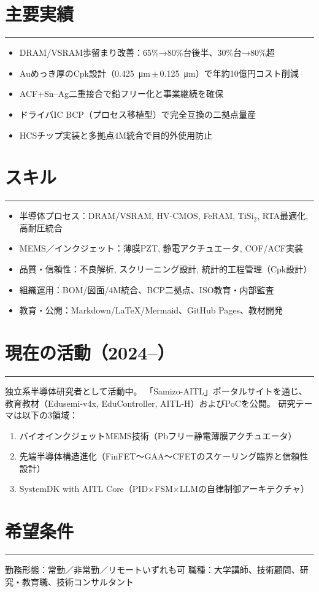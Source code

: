 \documentclass[11pt,ja=standard]{bxjsarticle}
\newcommand{\cvsection}[1]{\section*{#1}\vspace{-0.3em}\hrule\vspace{0.5em}}
\begin{document}
\cvsection{主要実績}
\begin{itemize}
  \item DRAM/VSRAM歩留まり改善：65\%→80\%台後半、30\%台→80\%超
  \item Auめっき厚のCpk設計（\SI{0.425}{\micro\metre}\,\(\pm\)\,\SI{0.125}{\micro\metre}）で年約10億円コスト削減
  \item ACF+Sn--Ag二重接合で鉛フリー化と事業継続を確保
  \item ドライバIC BCP（プロセス移植型）で完全互換の二拠点量産
  \item HCSチップ実装と多拠点4M統合で目的外使用防止
\end{itemize}

\cvsection{スキル}
\begin{itemize}
  \item 半導体プロセス：DRAM/VSRAM, HV-CMOS, FeRAM, TiSi$_2$, RTA最適化, 高耐圧統合
  \item MEMS／インクジェット：薄膜PZT, 静電アクチュエータ, COF/ACF実装
  \item 品質・信頼性：不良解析, スクリーニング設計, 統計的工程管理（Cpk設計）
  \item 組織運用：BOM/図面/4M統合、BCP二拠点、ISO教育・内部監査
  \item 教育・公開：Markdown/LaTeX/Mermaid、GitHub Pages、教材開発
\end{itemize}

\cvsection{現在の活動（2024--）}
独立系半導体研究者として活動中。  
「Samizo-AITL」ポータルサイトを通じ、教育教材（Edusemi-v4x, EduController, AITL-H）およびPoCを公開。  
研究テーマは以下の3領域：
\begin{enumerate}
  \item バイオインクジェットMEMS技術（Pbフリー静電薄膜アクチュエータ）
  \item 先端半導体構造進化（FinFET～GAA～CFETのスケーリング臨界と信頼性設計）
  \item SystemDK with AITL Core（PID×FSM×LLMの自律制御アーキテクチャ）
\end{enumerate}

\cvsection{希望条件}
勤務形態：常勤／非常勤／リモートいずれも可  
職種：大学講師、技術顧問、研究・教育職、技術コンサルタント
\end{document}
